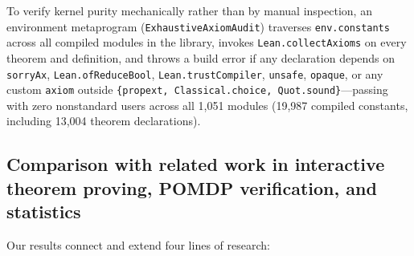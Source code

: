 \documentclass[11pt,a4paper]{article}
\begin{document}
To verify kernel purity mechanically rather than by manual inspection,
an environment metaprogram (\texttt{ExhaustiveAxiomAudit}) traverses
\texttt{env.constants} across all compiled modules in the library,
invokes \texttt{Lean.collectAxioms} on every theorem and definition, and
throws a build error if any declaration depends on \texttt{sorryAx},
\texttt{Lean.ofReduceBool}, \texttt{Lean.trustCompiler},
\texttt{unsafe}, \texttt{opaque}, or any custom \texttt{axiom} outside
\texttt{\{propext,\ Classical.choice,\ Quot.sound\}}---passing with zero
nonstandard users across all 1,051 modules (19,987 compiled constants,
including 13,004 theorem declarations).

\subsection{Comparison with related work in interactive theorem proving,
POMDP verification, and
statistics}\label{comparison-with-related-work-in-interactive-theorem-proving-pomdp-verification-and-statistics}

Our results connect and extend four lines of research:
\end{document}
